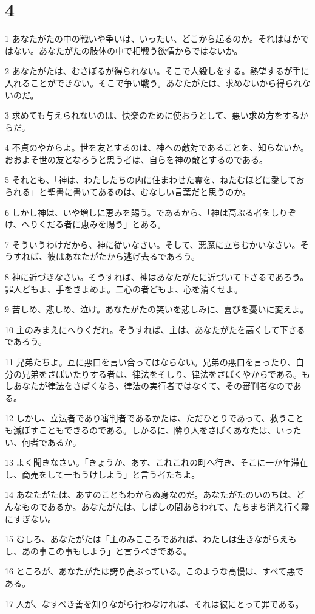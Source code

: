 \chapter{4}

\par 1 あなたがたの中の戦いや争いは、いったい、どこから起るのか。それはほかではない。あなたがたの肢体の中で相戦う欲情からではないか。
\par 2 あなたがたは、むさぼるが得られない。そこで人殺しをする。熱望するが手に入れることができない。そこで争い戦う。あなたがたは、求めないから得られないのだ。
\par 3 求めても与えられないのは、快楽のために使おうとして、悪い求め方をするからだ。
\par 4 不貞のやからよ。世を友とするのは、神への敵対であることを、知らないか。おおよそ世の友となろうと思う者は、自らを神の敵とするのである。
\par 5 それとも、「神は、わたしたちの内に住まわせた霊を、ねたむほどに愛しておられる」と聖書に書いてあるのは、むなしい言葉だと思うのか。
\par 6 しかし神は、いや増しに恵みを賜う。であるから、「神は高ぶる者をしりぞけ、へりくだる者に恵みを賜う」とある。
\par 7 そういうわけだから、神に従いなさい。そして、悪魔に立ちむかいなさい。そうすれば、彼はあなたがたから逃げ去るであろう。
\par 8 神に近づきなさい。そうすれば、神はあなたがたに近づいて下さるであろう。罪人どもよ、手をきよめよ。二心の者どもよ、心を清くせよ。
\par 9 苦しめ、悲しめ、泣け。あなたがたの笑いを悲しみに、喜びを憂いに変えよ。
\par 10 主のみまえにへりくだれ。そうすれば、主は、あなたがたを高くして下さるであろう。
\par 11 兄弟たちよ。互に悪口を言い合ってはならない。兄弟の悪口を言ったり、自分の兄弟をさばいたりする者は、律法をそしり、律法をさばくやからである。もしあなたが律法をさばくなら、律法の実行者ではなくて、その審判者なのである。
\par 12 しかし、立法者であり審判者であるかたは、ただひとりであって、救うことも滅ぼすこともできるのである。しかるに、隣り人をさばくあなたは、いったい、何者であるか。
\par 13 よく聞きなさい。「きょうか、あす、これこれの町へ行き、そこに一か年滞在し、商売をして一もうけしよう」と言う者たちよ。
\par 14 あなたがたは、あすのこともわからぬ身なのだ。あなたがたのいのちは、どんなものであるか。あなたがたは、しばしの間あらわれて、たちまち消え行く霧にすぎない。
\par 15 むしろ、あなたがたは「主のみこころであれば、わたしは生きながらえもし、あの事この事もしよう」と言うべきである。
\par 16 ところが、あなたがたは誇り高ぶっている。このような高慢は、すべて悪である。
\par 17 人が、なすべき善を知りながら行わなければ、それは彼にとって罪である。

